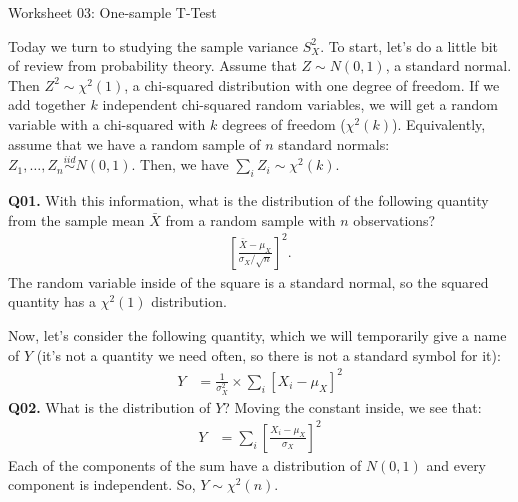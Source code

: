 \documentclass[12pt]{article}
\newcommand{\iid}{\stackrel{iid}{\sim}}
\newcommand{\cblack}{\color{Black}}
\newcommand{\cblue}{\color{MidnightBlue}}
\begin{document}
{\large Worksheet 03: One-sample T-Test}

\vspace*{18pt}
Today we turn to studying the sample variance $S_X^2$. To start, let's
do a little bit of review from probability theory. Assume that
$Z \sim N(0, 1)$, a standard normal. Then $Z^2 \sim \chi^2(1)$, a 
chi-squared distribution with one degree of freedom. If we add together
$k$ independent chi-squared random variables, we will get a random
variable with a chi-squared with $k$ degrees of freedom ($\chi^2(k)$). 
Equivalently, assume that we have a random sample of $n$ standard
normals: $Z_1, \ldots, Z_n \iid N(0, 1)$. Then, we have $\sum_i Z_i \sim \chi^2(k)$.

\textbf{Q01.} With this information, what is the distribution of the
following quantity from the sample mean $\bar{X}$ from a random sample
with $n$ observations?
\begin{align*}
\left[\frac{\bar{X} - \mu_X}{\sigma_X / \sqrt{n}} \right]^2.
\end{align*}
\cblue The random variable inside of the square is a standard normal, so
the squared quantity has a $\chi^2(1)$ distribution. \cblack

Now, let's consider the following quantity, which we will temporarily
give a name of $Y$ (it's not a quantity we need often, so there is not
a standard symbol for it):
\begin{align*}
Y &= \frac{1}{\sigma_X^2} \times \sum_i \left[ X_i - \mu_X \right]^2 
\end{align*}
\textbf{Q02.} What is the distribution of $Y$? \cblue Moving the constant
inside, we see that:
\begin{align*}
Y &=  \sum_i \left[ \frac{X_i - \mu_X}{\sigma_X} \right]^2 
\end{align*}
Each of the components of the sum have a distribution of $N(0, 1)$ and
every component is independent. So, $Y \sim \chi^2(n)$.
\cblack
\end{document}
